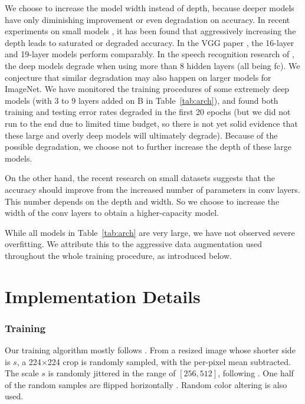 \documentclass[10pt,twocolumn,letterpaper]{article}
\begin{document}
We choose to increase the model width instead of depth, because deeper models have only diminishing improvement or even degradation on accuracy.
In recent experiments on small models \cite{He2014a}, it has been found that aggressively increasing the depth leads to saturated or degraded accuracy. In the VGG paper \cite{Simonyan2014}, the 16-layer and 19-layer models perform comparably. In the speech recognition research of \cite{Zeiler2013}, the deep models degrade when using more than 8 hidden layers (all being fc).
We conjecture that similar degradation may also happen on larger models for ImageNet. We have monitored the training procedures of some extremely deep models (with 3 to 9 layers added on B in Table~\ref{tab:arch}), and found both training and testing error rates degraded in the first 20 epochs (but we did not run to the end due to limited time budget, so there is not yet solid evidence that these large and overly deep models will ultimately degrade). Because of the possible degradation, we choose not to further increase the depth of these large models.

On the other hand, the recent research \cite{Eigen2013} on small datasets suggests that the accuracy should improve from the increased number of parameters in conv layers. This number depends on the depth and width. So we choose to increase the width of the conv layers to obtain a higher-capacity model.

While all models in Table~\ref{tab:arch} are very large, we have not observed severe overfitting. We attribute this to the aggressive data augmentation used throughout the whole training procedure, as introduced below.

\section{Implementation Details}

\subsubsection*{Training}

Our training algorithm mostly follows \cite{Krizhevsky2012,Howard2013,Chatfield2014,He2014,Simonyan2014}. From a resized image whose shorter side is $s$, a 224$\times$224 crop is randomly sampled, with the per-pixel mean subtracted. The scale $s$ is randomly jittered in the range of $[256, 512]$, following \cite{Simonyan2014}. One half of the random samples are flipped horizontally \cite{Krizhevsky2012}. Random color altering \cite{Krizhevsky2012} is also used.
\end{document}
